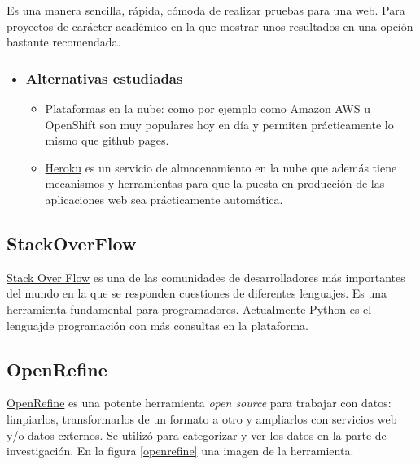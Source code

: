Es una manera sencilla, rápida, cómoda de realizar pruebas para una web. Para proyectos de carácter académico en la que mostrar unos resultados en una opción bastante recomendada.

\begin{itemize}
	\item \subsubsection{Alternativas estudiadas}
	\begin{itemize}
		\item Plataformas en la nube:  como por ejemplo como Amazon AWS u OpenShift son muy populares hoy en día y permiten prácticamente lo mismo que github pages.
		\item \href{https://www.heroku.com/}{Heroku}  es un servicio de almacenamiento en la nube que además tiene mecanismos y herramientas para que la puesta en producción de las aplicaciones web sea prácticamente automática.
	\end{itemize}
\end{itemize}
    
 \subsection{StackOverFlow}

\href{https://stackoverflow.com/}{Stack Over Flow} es una de las comunidades de desarrolladores más importantes del mundo en la que se responden cuestiones de diferentes lenguajes. Es una herramienta fundamental para programadores. Actualmente Python es el lenguajde programación con más consultas en la plataforma.

 \subsection{OpenRefine}

\href{https://github.com/OpenRefine/OpenRefine}{OpenRefine} es una potente herramienta \textit{open source} para trabajar con datos: limpiarlos, transformarlos de un formato a otro y ampliarlos con servicios web y/o datos externos. Se utilizó para categorizar y ver los datos en la parte de investigación. En la figura \ref{openrefine} una imagen de la herramienta.


